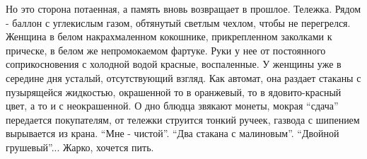 Но это сторона потаенная, а память вновь возвращает в прошлое. Тележка. Рядом -
баллон с углекислым газом, обтянутый светлым чехлом, чтобы не перегрелся.
Женщина в белом накрахмаленном кокошнике, прикрепленном закол­ками к прическе,
в белом же непромокаемом фартуке. Руки у нее от постоянного соприкосновения с
холодной водой красные, воспаленные. У женщины уже в середине дня усталый,
отсутствующий взгляд. Как автомат, она раздает стаканы с пузырящейся жидкостью,
окрашенной то в оранжевый, то в ядовито-красный цвет, а то и с неокрашенной. О
дно блюдца звякают монеты, мокрая \enquote{сдача} передается покупателям, от тележки
струится тонкий ручеек, газвода с шипением вырывается из крана. \enquote{Мне - чистой}.
\enquote{Два стакана с малиновым}. \enquote{Двойной  грушевый}... Жарко, хочется пить.
